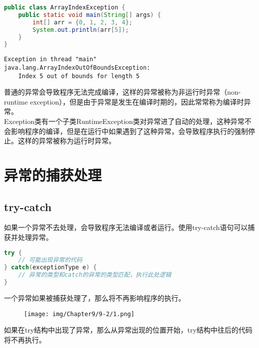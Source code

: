 
\begin{lstlisting}[language=Java]
public class ArrayIndexException {
    public static void main(String[] args) {
        int[] arr = {0, 1, 2, 3, 4};
        System.out.println(arr[5]);
    }
}
\end{lstlisting}

\begin{tcolorbox}
    \begin{verbatim}
Exception in thread "main"
java.lang.ArrayIndexOutOfBoundsException:
    Index 5 out of bounds for length 5
	\end{verbatim}
\end{tcolorbox}

普通的异常会导致程序无法完成编译，这样的异常被称为非运行时异常（non-runtime exception），但是由于异常是发生在编译时期的，因此常常称为编译时异常。\\

Exception类有一个子类RuntimeException类对异常进了自动的处理，这种异常不会影响程序的编译，但是在运行中如果遇到了这种异常，会导致程序执行的强制停止。这样的异常被称为运行时异常。

\newpage

\section{异常的捕获处理}

\subsection{try-catch}

如果一个异常不去处理，会导致程序无法编译或者运行。使用try-catch语句可以捕获并处理异常。

\vspace{-0.5cm}

\begin{lstlisting}[language=Java]
try {
    // 可能出现异常的代码
} catch(exceptionType e) {
    // 异常的类型和catch的异常的类型匹配，执行此处逻辑
}
\end{lstlisting}

一个异常如果被捕获处理了，那么将不再影响程序的执行。

\begin{figure}[H]
    \centering
    \texttt{[image: img/Chapter9/9-2/1.png]}
\end{figure}

如果在try结构中出现了异常，那么从异常出现的位置开始，try结构中往后的代码将不再执行。\\

